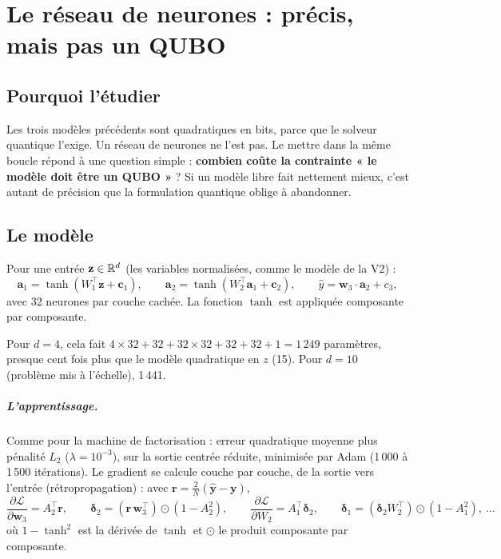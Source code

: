 \chapter{Le réseau de neurones : précis, mais pas un QUBO}\label{ch:mlp}

\section{Pourquoi l'étudier}
Les trois modèles précédents sont quadratiques en bits, parce que le solveur quantique l'exige. Un réseau de neurones ne l'est pas. Le mettre dans la même boucle répond à une question simple : \textbf{combien coûte la contrainte « le modèle doit être un QUBO »} ? Si un modèle libre fait nettement mieux, c'est autant de précision que la formulation quantique oblige à abandonner.

\section{Le modèle}
\begin{definition}
Pour une entrée $\mathbf z\in\mathbb{R}^d$ (les variables normalisées, comme le modèle de la V2) :
\[ \mathbf a_1=\tanh(W_1^\top\mathbf z+\mathbf c_1),\qquad\mathbf a_2=\tanh(W_2^\top\mathbf a_1+\mathbf c_2),\qquad\hat y=\mathbf w_3\cdot\mathbf a_2+c_3, \]
avec 32 neurones par couche cachée. La fonction $\tanh$ est appliquée composante par composante.
\end{definition}
Pour $d=4$, cela fait $4\times32+32+32\times32+32+32+1=1\,249$ paramètres, presque cent fois plus que le modèle quadratique en $z$ (15). Pour $d=10$ (problème mis à l'échelle), 1\,441.

\paragraph{L'apprentissage.} Comme pour la machine de factorisation : erreur quadratique moyenne plus pénalité $L_2$ ($\lambda=10^{-3}$), sur la sortie centrée réduite, minimisée par Adam (1\,000 à 1\,500 itérations). Le gradient se calcule couche par couche, de la sortie vers l'entrée (rétropropagation) : avec $\mathbf r=\frac2N(\hat{\mathbf y}-\mathbf y)$,
\[ \frac{\partial\mathcal L}{\partial\mathbf w_3}=A_2^\top\mathbf r,\qquad\boldsymbol\delta_2=(\mathbf r\,\mathbf w_3^\top)\odot(1-A_2^2),\qquad\frac{\partial\mathcal L}{\partial W_2}=A_1^\top\boldsymbol\delta_2,\qquad\boldsymbol\delta_1=(\boldsymbol\delta_2W_2^\top)\odot(1-A_1^2),\ \dots \]
où $1-\tanh^2$ est la dérivée de $\tanh$ et $\odot$ le produit composante par composante.

